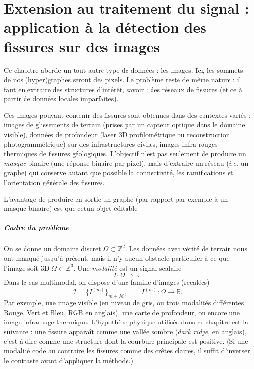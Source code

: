 

\chapter{Extension au traitement du signal : application à la détection des fissures sur des images}
\label{chap:frangi_fissures}

\providecommand{\Frangi}{\textnormal{\textsc{Frangi}}}
\providecommand{\Hess}{\mathcal H}
\providecommand{\matnorm}[1]{\left\lvert\mkern-2mu\left\lvert\mkern-2mu\left\lvert #1 \right\rvert\mkern-2mu\right\rvert\mkern-2mu\right\rvert}

Ce chapitre aborde un tout autre type de données : les images.
Ici, les sommets de nos (hyper)graphes seront des pixels. Le problème reste de même nature : il faut en extraire des structures d'intérêt, savoir : des réseaux de fissures (et ce à partir de données locales imparfaites). 

Ces images pouvant contenir des fissures sont obtenues dans des contextes variés : images de glissements de terrain (prises par un capteur optique dans le domaine visible), données de profondeur (laser 3D profilométrique \cite{FIND2022} ou reconstruction photogrammétrique) sur des infrastructures civiles, images infra-rouges thermiques de fissures géologiques. L'objectif n'est pas seulement de produire un \emph{masque} binaire (une réponse binaire par pixel), mais d'extraire un réseau (\emph{i.e.} un graphe) qui conserve autant que possible la connectivité, les ramifications et l'orientation générale des fissures.

L'avantage de produire en sortie un graphe (par rapport par exemple à un masque binaire) est que cetun objet éditable



\paragraph{Cadre du problème}
On se donne un domaine discret $\Omega \subset \mathbb Z^2$. Les données avec vérité de terrain nous ont manqué jusqu'à présent, mais il n'y aucun obstacle particulier à ce que l'image soit 3D $\Omega \subset \mathbb Z^3$. Une \emph{modalité} est un signal scalaire
\[
    I : \Omega \longrightarrow \mathbb R.
\]
Dans le cas multimodal, on dispose d'une famille d'images (recalées)
\[
    \mathcal I = \{I^{(m)}\}_{m\in\mathcal M},
    \qquad I^{(m)} : \Omega \longrightarrow \mathbb R.
\]
Par exemple, une image visible (en niveau de gris, ou trois modalités différentes Rouge, Vert et Bleu, RGB en anglais), une carte de profondeur, ou encore une image infrarouge thermique. L'hypothèse physique utilisée dans ce chapitre est la suivante : une fissure apparaît comme une vallée sombre (\emph{dark ridge}, en anglais), c'est-à-dire comme une structure dont la courbure principale est positive. (Si une modalité code au contraire les fissures comme des crêtes claires, il suffit d'inverser le contraste avant d'appliquer la méthode.)

